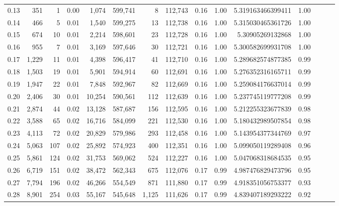 \begin{tabular}{rrrrrrrrrrrrrrr}
0.13 &     351 &      1 &  0.00 &    1,074 &  599,741 &        8 &  112,743 &  0.16 &  1.00 &       5.319163466399411 &      1.00 \\
0.14 &     466 &      5 &  0.01 &    1,540 &  599,275 &       13 &  112,738 &  0.16 &  1.00 &       5.315030465361726 &      1.00 \\
0.15 &     674 &     10 &  0.01 &    2,214 &  598,601 &       23 &  112,728 &  0.16 &  1.00 &        5.30905269132868 &      1.00 \\
0.16 &     955 &      7 &  0.01 &    3,169 &  597,646 &       30 &  112,721 &  0.16 &  1.00 &       5.300582699931708 &      1.00 \\
0.17 &   1,229 &     11 &  0.01 &    4,398 &  596,417 &       41 &  112,710 &  0.16 &  1.00 &       5.289682574877385 &      0.99 \\
0.18 &   1,503 &     19 &  0.01 &    5,901 &  594,914 &       60 &  112,691 &  0.16 &  1.00 &       5.276352316165711 &      0.99 \\
0.19 &   1,947 &     22 &  0.01 &    7,848 &  592,967 &       82 &  112,669 &  0.16 &  1.00 &       5.259084176637014 &      0.99 \\
0.20 &   2,406 &     30 &  0.01 &   10,254 &  590,561 &      112 &  112,639 &  0.16 &  1.00 &       5.237745119777208 &      0.99 \\
0.21 &   2,874 &     44 &  0.02 &   13,128 &  587,687 &      156 &  112,595 &  0.16 &  1.00 &       5.212255323677839 &      0.98 \\
0.22 &   3,588 &     65 &  0.02 &   16,716 &  584,099 &      221 &  112,530 &  0.16 &  1.00 &       5.180432989507854 &      0.98 \\
0.23 &   4,113 &     72 &  0.02 &   20,829 &  579,986 &      293 &  112,458 &  0.16 &  1.00 &       5.143954377344769 &      0.97 \\
0.24 &   5,063 &    107 &  0.02 &   25,892 &  574,923 &      400 &  112,351 &  0.16 &  1.00 &       5.099050119289408 &      0.96 \\
0.25 &   5,861 &    124 &  0.02 &   31,753 &  569,062 &      524 &  112,227 &  0.16 &  1.00 &       5.047068318684535 &      0.95 \\
0.26 &   6,719 &    151 &  0.02 &   38,472 &  562,343 &      675 &  112,076 &  0.17 &  0.99 &       4.987476829473796 &      0.95 \\
0.27 &   7,794 &    196 &  0.02 &   46,266 &  554,549 &      871 &  111,880 &  0.17 &  0.99 &       4.918351056753377 &      0.93 \\
0.28 &   8,901 &    254 &  0.03 &   55,167 &  545,648 &    1,125 &  111,626 &  0.17 &  0.99 &       4.839407189293222 &      0.92 \\

\end{tabular}
